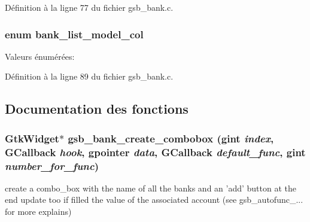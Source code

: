 Définition à la ligne 77 du fichier gsb\_\-bank.c.

\subsubsection[{bank\_\-list\_\-model\_\-col}]{\setlength{\rightskip}{0pt plus 5cm}enum {\bf bank\_\-list\_\-model\_\-col}}\label{gsb__bank_8c_aa9205d71df729c5e05c3a703d21bc6e8}
\begin{Desc}
\item[Valeurs énumérées: ]\par
\begin{description}
\item[{\em 
BANK\_\-NAME\_\-COL\label{gsb__bank_8c_aa9205d71df729c5e05c3a703d21bc6e8a41aaa2e414041f55d51ec61ba2009d52}
}]\item[{\em 
BANK\_\-NUMBER\_\-COL\label{gsb__bank_8c_aa9205d71df729c5e05c3a703d21bc6e8a1c1d9b356dd7208482d589998060f4d2}
}]\end{description}
\end{Desc}



Définition à la ligne 89 du fichier gsb\_\-bank.c.



\subsection{Documentation des fonctions}
\subsubsection[{gsb\_\-bank\_\-create\_\-combobox}]{\setlength{\rightskip}{0pt plus 5cm}GtkWidget$\ast$ gsb\_\-bank\_\-create\_\-combobox (gint {\em index}, \/  GCallback {\em hook}, \/  gpointer {\em data}, \/  GCallback {\em default\_\-func}, \/  gint {\em number\_\-for\_\-func})}\label{gsb__bank_8c_abb748391feb66dfd26c0e0aaffa766bb}
create a combo\_\-box with the name of all the banks and an 'add' button at the end update too if filled the value of the associated account (see gsb\_\-autofunc\_\-... for more explains)


